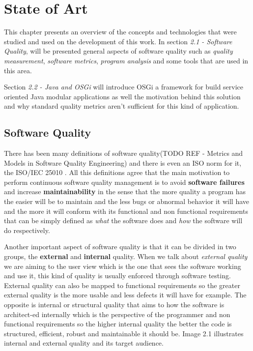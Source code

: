 \chapter{State of Art}
This chapter presents an overview of the concepts and technologies that were studied and used on the development of this work. 
In section \textit{2.1 - Software Quality}, will be presented general aspects of software quality such as \textit{quality measurement},  \textit{software metrics}, \textit{program analysis} and some tools that are used in this area.  

Section \textit{2.2 - Java and OSGi} will introduce OSGi a framework for build service oriented Java modular applications as well the motivation 
behind this solution and why standard quality metrics aren't sufficient for this kind of application. 


\section{Software Quality}

There has been many definitions of software quality(TODO REF - Metrics and Models in Software Quality Engineering) and there is even an ISO norm for it, the ISO/IEC 25010 \citep{iso 2011}. All this definitions agree that the main motivation to perform continuous software quality management is to avoid \textbf{software failures} and increase \textbf{maintainability} in the sense that the more quality a program has the easier will be to maintain and the less bugs or abnormal behavior it will have and the more it will conform with its functional and non functional requirements that can be simply defined as \textit{what} the software does and \textit{how} the software will do respectively. 

Another important aspect of software quality is that it can be divided in two groups, the \textbf{external} and \textbf{internal} quality. When we talk about \textit{external quality} we are aiming to the user view which is the one that sees the software working and use it, this kind of quality is usually enforced through software testing. External quality can also be mapped to functional requirements so the greater external quality is the more usable and less defects it will have for example. The opposite is internal or structural quality that aims to how the software is architect-ed internally which is the perspective of the programmer and non functional requirements so the higher internal quality the better the code is structured, efficient, robust and maintainable it should be. Image 2.1 illustrates internal and external quality and its target audience.


